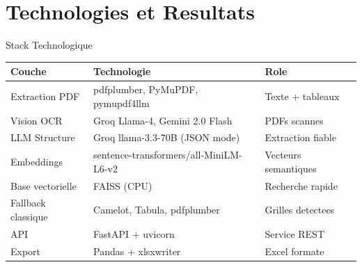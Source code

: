 \documentclass[aspectratio=169, 10pt]{beamer}
\begin{document}
\section{Technologies et Resultats}

\begin{frame}{Stack Technologique}
  \centering
  \vspace{0.15cm}
  \begin{tabular}{@{}lll@{}}
    \toprule
    \textbf{Couche}      & \textbf{Technologie}                   & \textbf{Role} \\
    \midrule
    Extraction PDF       & pdfplumber, PyMuPDF, pymupdf4llm       & Texte + tableaux \\
    Vision OCR           & Groq Llama-4, Gemini 2.0 Flash         & PDFs scannes \\
    LLM Structure        & Groq llama-3.3-70B (JSON mode)         & Extraction fiable \\
    Embeddings           & sentence-transformers/all-MiniLM-L6-v2 & Vecteurs semantiques \\
    Base vectorielle     & FAISS (CPU)                            & Recherche rapide \\
    Fallback classique   & Camelot, Tabula, pdfplumber            & Grilles detectees \\
    API                  & FastAPI + uvicorn                      & Service REST \\
    Export               & Pandas + xlsxwriter                    & Excel formate \\
    \bottomrule
  \end{tabular}


\end{frame}
\end{document}
